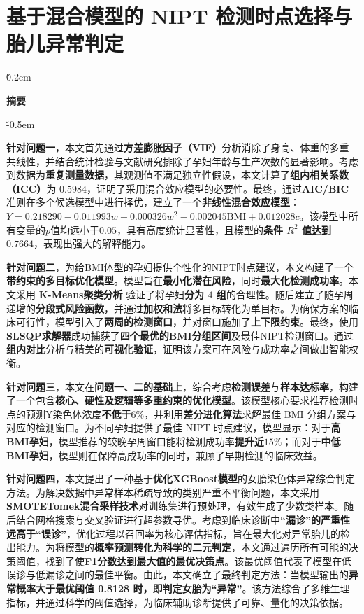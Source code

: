\documentclass[a4paper, oneside, 12pt]{article}
\begin{document}
\section*{基于混合模型的 NIPT 检测时点选择与胎儿异常判定}

\v{0.2em}

\begin{center}
    \large\bfseries
    摘要
\end{center}

\v{-0.5em}

\textbf{针对问题一}，本文首先通过\textbf{方差膨胀因子（VIF）}分析消除了身高、体重的多重共线性，并结合统计检验与文献研究排除了孕妇年龄与生产次数的显著影响。考虑到数据为\textbf{重复测量数据}，其观测值不满足独立性假设，本文计算了\textbf{组内相关系数（ICC）}为 $0.5984$，证明了采用混合效应模型的必要性。最终，通过\textbf{AIC/BIC}准则在多个候选模型中进行择优，建立了一个\textbf{非线性混合效应模型}：$Y = 0.218290 - 0.011993 w + 0.000326 w^2 - 0.002045 \text{BMI} + 0.012028 c$。该模型中所有变量的$p$值均远小于$0.05$，具有高度统计显著性，且模型的\textbf{条件 $R^2$ 值达到 $0.7664$}，表现出强大的解释能力。

\textbf{针对问题二}，为给BMI体型的孕妇提供个性化的NIPT时点建议，本文构建了一个\textbf{带约束的多目标优化模型}。模型旨在\textbf{最小化潜在风险}，同时\textbf{最大化检测成功率}。本文采用 \textbf{K-Means聚类分析} 验证了将孕妇\textbf{分为 $4$ 组}的合理性。随后建立了随孕周递增的\textbf{分段式风险函数}，并通过\textbf{加权和法}将多目标转化为单目标。为确保方案的临床可行性，模型引入了\textbf{两周的检测窗口}，并对窗口施加了\textbf{上下限约束}。最终，使用\textbf{SLSQP求解器}成功捕获了\textbf{四个最优的BMI分组区间}及最佳NIPT检测窗口。通过\textbf{组内对比}分析与精美的\textbf{可视化验证}，证明该方案可在风险与成功率之间做出智能权衡。

\textbf{针对问题三}，本文在\textbf{问题一、二的基础上}，综合考虑\textbf{检测误差}与\textbf{样本达标率}，构建了一个包含\textbf{核心、硬性及逻辑等多重约束的优化模型}。该模型核心要求推荐检测时点的预测Y染色体浓度\textbf{不低于$6\%$}，并利用\textbf{差分进化算法}求解最佳 BMI 分组方案与对应的检测窗口。为不同孕妇提供了最佳 NIPT 时点建议，模型显示：对于\textbf{高BMI孕妇}，模型推荐的较晚孕周窗口能将检测成功率\textbf{提升近$15\%$}；而对于\textbf{中低BMI孕妇}，模型则在保障高成功率的同时，兼顾了早期检测的临床效益。

\textbf{针对问题四}，本文提出了一种基于\textbf{优化XGBoost模型}的女胎染色体异常综合判定方法。为解决数据中异常样本稀疏导致的类别严重不平衡问题，本文采用\textbf{SMOTETomek混合采样技术}对训练集进行预处理，有效生成了少数类样本。随后结合网格搜索与交叉验证进行超参数寻优。考虑到临床诊断中\textbf{“漏诊”的严重性远高于“误诊”}，优化过程以召回率为核心评估指标，旨在最大化对异常胎儿的检出能力。为将模型的\textbf{概率预测转化为科学的二元判定}，本文通过遍历所有可能的决策阈值，找到了使\textbf{F1分数达到最大值的最优决策点}。该最优阈值代表了模型在低误诊与低漏诊之间的最佳平衡。由此，本文确立了最终判定方法：当模型输出的\textbf{异常概率大于最优阈值 0.8128 时，即判定女胎为“异常”}。该方法综合了多维生理指标，并通过科学的阈值选择，为临床辅助诊断提供了可靠、量化的决策依据。
\end{document}
